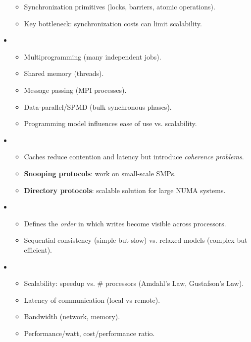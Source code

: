 \begin{itemize}
    \begin{itemize}
        \item Synchronization primitives (locks, barriers, atomic operations).
        \item Key bottleneck: synchronization costs can limit scalability.
    \end{itemize}
    \item {}
    \begin{itemize}
        \item Multiprogramming (many independent jobs).
        \item Shared memory (threads).
        \item Message passing (MPI processes).
        \item Data-parallel/SPMD (bulk synchronous phases).
        \item Programming model influences ease of use vs. scalability.
    \end{itemize}
    \item {}
    \begin{itemize}
        \item Caches reduce contention and latency but introduce \emph{coherence problems}.
        \item \textbf{Snooping protocols}: work on small-scale SMPs.
        \item \textbf{Directory protocols}: scalable solution for large NUMA systems.
    \end{itemize}
    \item {}
    \begin{itemize}
        \item Defines the \emph{order} in which writes become visible across processors.
        \item Sequential consistency (simple but slow) vs. relaxed models (complex but efficient).
    \end{itemize}
    \item {}
    \begin{itemize}
        \item Scalability: speedup vs. $\#$ processors (Amdahl's Law, Gustafson's Law).
        \item Latency of communication (local vs remote).
        \item Bandwidth (network, memory).
        \item Performance/watt, cost/performance ratio.
    \end{itemize}
\end{itemize}